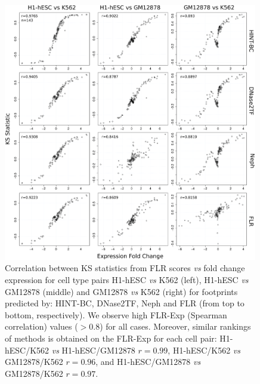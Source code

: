 \documentclass[11pt]{article}
\begin{document}



\clearpage


\begin{figure}[h!]
\centering
\includegraphics[width=0.99\textwidth]{Figs/Fig1.pdf}
\caption{Correlation between KS statistics from FLR scores \textit{vs} fold change expression for cell type pairs H1-hESC \textit{vs} K562 (left), H1-hESC \textit{vs} GM12878 (middle) and GM12878 \textit{vs} K562 (right) for footprints predicted by: HINT-BC, DNase2TF, Neph and FLR (from top to bottom, respectively). We observe high FLR-Exp (Spearman correlation) values ($> 0.8$) for all cases. Moreover, similar rankings of methods is obtained on the FLR-Exp for each cell pair: H1-hESC/K562 \textit{vs} H1-hESC/GM12878 $r = 0.99$, H1-hESC/K562 \textit{vs} GM12878/K562 $r = 0.96$, and H1-hESC/GM12878 \textit{vs} GM12878/K562 $r = 0.97$.}
\label{fig:flrexpmethod}
\end{figure}

\clearpage
\end{document}
